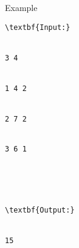 Example
\begin{verbatim}
\textbf{Input:}


3 4


1 4 2


2 7 2


3 6 1





\textbf{Output:}


15


\end{verbatim}